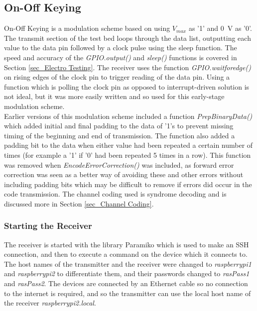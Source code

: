 \documentclass[../main.tex]{subfiles}
\begin{document}
\subsection{On-Off Keying} \label{sec_On-Off Keying}

On-Off Keying is a modulation scheme based on using $V_{max}$ as '1' and \SI{0}{\volt} as '0'.
The transmit section of the test bed loops through the data list, outputting each value to the data pin followed by a clock pulse using the sleep function.
The speed and accuracy of the \textit{GPIO.output()} and \textit{sleep()} functions is covered in Section \ref{sec_Electro Testing}.
The receiver uses the function \textit{GPIO.wait\textunderscore for\textunderscore edge()} on rising edges of the clock pin to trigger reading of the data pin.
Using a function which is polling the clock pin as opposed to interrupt-driven solution is not ideal, but it was more easily written and so used for this early-stage modulation scheme.\\

Earlier versions of this modulation scheme included a function \textit{Prep\textunderscore Binary\textunderscore Data()} which added initial and final padding to the data of '1's to prevent missing timing of the beginning and end of transmission.
The function also added a padding bit to the data when either value had been repeated a certain number of times (for example a '1' if '0' had been repeated 5 times in a row).
This function was removed when \textit{Encode\textunderscore Error\textunderscore Correction()} was included, as forward error correction was seen as a better way of avoiding these and other errors without including padding bits which may be difficult to remove if errors did occur in the code transmission.
The channel coding used is syndrome decoding and is discussed more in Section \ref{sec_Channel Coding}.\\


\subsubsection{Starting the Receiver}

The receiver is started with the library Paramiko \cite{lib_Paramiko} which is used to make an SSH connection, and then to execute a command on the device which it connects to.
The host names of the transmitter and the receiver were changed to \textit{raspberrypi1} and \textit{raspberrypi2} to differentiate them, and their passwords changed to \textit{rasPass1} and \textit{rasPass2}.
The devices are connected by an Ethernet cable so no connection to the internet is required, and so the transmitter can use the local host name of the receiver \textit{raspberrypi2.local}.\\
\end{document}
